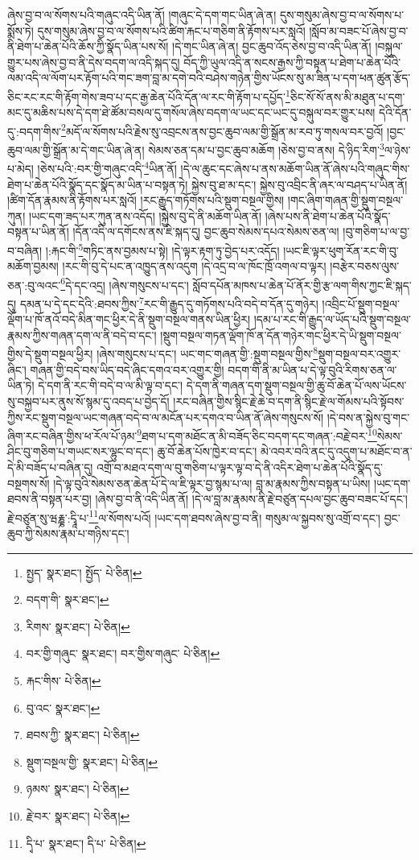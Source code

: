 ཞེས་བྱ་བ་ལ་སོགས་པའི་གཞུང་འདི་ཡིན་ནོ། །གཞུང་དེ་དག་གང་ཡིན་ཞེ་ན། དུས་གསུམ་ཞེས་བྱ་བ་ལ་སོགས་པ་སྨོས་ཏེ། དུས་གསུམ་ཞེས་བྱ་བ་ལ་སོགས་པའི་ཚིག་རྐང་པ་གཅིག་ནི་རྟོགས་པར་སླའོ། །སློབ་མ་བཟང་པོ་ཞེས་བྱ་བ་ནི་ཐེག་པ་ཆེན་པོའི་ཆོས་ཀྱི་སྣོད་ཡིན་པས་སོ། །དེ་གང་ཡིན་ཞེ་ན། བྱང་ཆུབ་འོད་ཅེས་བྱ་བ་འདི་ཡིན་ནོ། །བསྐུལ་གྱུར་པས་ཞེས་བྱ་བ་ནི་དེས་བདག་ལ་འདི་སྐད་དུ། བོད་ཀྱི་ཡུལ་འདི་ན་སངས་རྒྱས་ཀྱི་བསྟན་པ་ཐེག་པ་ཆེན་པོའི་ལམ་འདི་ལ་ལོག་པར་རྟོག་པའི་གང་ཟག་བླ་མ་དགེ་བའི་བཤེས་གཉེན་གྱིས་ཡོངས་སུ་མ་ཟིན་པ་དག་ཕན་ཚུན་རྩོད་ཅིང་རང་རང་གི་རྟོག་གེས་ཟབ་པ་དང་རྒྱ་ཆེན་པོའི་དོན་ལ་རང་གི་རྟོག་པ་དཔྱོད་\footnote{སྤྱད་  སྣར་ཐང་། སྤྱོད་  པེ་ཅིན། }ཅིང་སོ་སོ་ནས་མི་མཐུན་པ་དག་མང་དུ་མཆིས་པས་དེ་དག་ཐེ་ཚོམ་བསལ་དུ་གསོལ་ཞེས་བདག་ལ་ཡང་དང་ཡང་དུ་བསྐུལ་བར་གྱུར་པས། དེའི་དོན་དུ་:བདག་གིས་\footnote{བདག་གི་  སྣར་ཐང་། }མདོ་ལ་སོགས་པའི་རྗེས་སུ་འབྲངས་ནས་བྱང་ཆུབ་ལམ་གྱི་སྒྲོན་མ་རབ་ཏུ་གསལ་བར་བྱའོ། །བྱང་ཆུབ་ལམ་གྱི་སྒྲོན་མ་དེ་གང་ཡིན་ཞེ་ན། སེམས་ཅན་དམ་པ་བྱང་ཆུབ་མཆོག །ཅེས་བྱ་བ་ནས། དེ་ཉིད་རིག་\footnote{རིགས་  སྣར་ཐང་།  པེ་ཅིན། }ལ་ཉེས་པ་མེད། །ཅེས་པའི་:བར་གྱི་གཞུང་འདི་\footnote{བར་གྱི་གཞུང་  སྣར་ཐང་། བར་གྱིས་གཞུང་  པེ་ཅིན། }ཡིན་ནོ། །དེ་ལ་ཆུང་དང་ཞེས་པ་ནས་མཆོག་ཡིན་ནོ་ཞེས་པའི་གཞུང་གིས་ཐེག་པ་ཆེན་པོའི་སྣོད་དང་སྣོད་མ་ཡིན་པ་བསྟན་ཏེ། སྐྱེས་བུ་ཐ་མ་དང་། སྐྱེས་བུ་འབྲིང་ནི་ཞར་ལ་བཤད་པ་ཡིན་ནོ། །ཚིག་དོན་རྣམས་ནི་རྟོགས་པར་སླའོ། །རང་རྒྱུད་གཏོགས་པའི་སྡུག་བསྔལ་གྱིས། །གང་ཞིག་གཞན་གྱི་སྡུག་བསྔལ་ཀུན། །ཡང་དག་ཟད་པར་ཀུན་ནས་འདོད། །སྐྱེས་བུ་དེ་ནི་མཆོག་ཡིན་ནོ། །ཞེས་པས་ནི་ཐེག་པ་ཆེན་པོའི་སྣོད་བསྟན་པ་ཡིན་ནོ། །དོན་འདི་ལ་དགོངས་ནས་ཇི་སྐད་དུ། བྱང་ཆུབ་སེམས་དཔའ་སེམས་ཅན་ལ། །བུ་གཅིག་པ་ལ་བྱ་བ་བཞིན། །:རྐང་གི་\footnote{རྐང་གིས་  པེ་ཅིན། }གཏིང་ནས་བྱམས་པ་སྟེ། །དེ་ལྟར་རྟག་ཏུ་བྱེད་པར་འདོད། །ཡང་ཇི་ལྟར་ཕུག་རོན་རང་གི་བུ་མཆོག་བྱམས། །རང་གི་བུ་དེ་པང་ན་འཁྱུད་ནས་འདུག །དེ་འདྲ་བ་ལ་ཁོང་ཁྲོ་འགལ་བ་ལྟར། །བརྩེར་བཅས་ལུས་ཅན་:བུ་ལའང་\footnote{བུ་འང་  སྣར་ཐང་། }དེ་དང་འདྲ། །ཞེས་གསུངས་པ་དང་། སློབ་དཔོན་མཁས་པ་ཆེན་པོ་ནོར་གྱི་རྩ་ལག་གིས་ཀྱང་ཇི་སྐད་དུ། དམན་པ་དེ་དང་དེའི་:ཐབས་ཀྱིས་\footnote{ཐབས་ཀྱི་  སྣར་ཐང་།  པེ་ཅིན། }རང་གི་རྒྱུད་དུ་གཏོགས་པའི་བདེ་བ་དོན་དུ་གཉེར། །འབྲིང་པོ་སྡུག་བསྔལ་ལྡོག་པ་ཁོ་ནའོ་བདེ་མིན་གང་ཕྱིར་དེ་ནི་སྡུག་བསྔལ་གནས་ཡིན་ཕྱིར། །དམ་པ་རང་གི་རྒྱུད་ལ་ཡོད་པའི་སྡུག་བསྔལ་རྣམས་ཀྱིས་གཞན་དག་ལ་ནི་བདེ་བ་དང་། །སྡུག་བསྔལ་གཏན་ལྡོག་ཁོ་ན་དོན་གཉེར་གང་ཕྱིར་དེ་ཡི་སྡུག་བསྔལ་གྱིས་དེ་སྡུག་བསྔལ་ཕྱིར། །ཞེས་གསུངས་པ་དང་། ཡང་གང་གཞན་གྱི་:སྡུག་བསྔལ་གྱིས་\footnote{སྡུག་བསྔལ་གྱི་  སྣར་ཐང་།  པེ་ཅིན། }སྡུག་བསྔལ་བར་འགྱུར་ཞིང་། གཞན་གྱི་བདེ་བས་ཡིད་བདེ་ཞིང་དགའ་བར་འགྱུར་གྱི། བདག་གི་ནི་མ་ཡིན་པ་དེ་ལྟ་བུའི་རིགས་ཅན་ལ་ཡིན་ཏེ། དེ་དག་ནི་རང་གི་བདེ་བ་ལ་མི་ལྟ་བ་དང་། དེ་དག་ནི་གཞན་དག་སྡུག་བསྔལ་གྱི་ཆུ་བོ་ཆེན་པོ་ལས་ཡོངས་སུ་བསྐྱབ་པར་ནུས་སོ་སྙམ་དུ་འབད་པ་བྱེད་དོ། །རང་བཞིན་གྱིས་སྙིང་རྗེ་ཆེ་བ་དག་ནི་སྙིང་རྗེ་ལ་གོམས་པའི་སྟོབས་ཀྱིས་རང་སྡུག་བསྔལ་ཡང་གཞན་བདེ་བ་ལ་མངོན་པར་དགའ་བ་ཡིན་ནོ་ཞེས་གསུངས་སོ། །དེ་བས་ན་སྐྱེས་བུ་གང་ཞིག་རང་བཞིན་གྱིས་ཕ་རོལ་པོ་ཉམ་\footnote{ཉམས་  སྣར་ཐང་།  པེ་ཅིན། }ཐག་པ་དག་མཐོང་ན་མི་བཟོད་ཅིང་བདག་དང་གཞན་:བརྗེ་བར་\footnote{རྗེ་བར་  སྣར་ཐང་།  པེ་ཅིན། }སེམས་ཤིང་བུ་གཅིག་པ་གཡང་སར་ལྷུང་བ་དང་། ཆུ་བོ་ཆེན་པོས་ཁྱེར་བ་དང་། མེ་འབར་བའི་ནང་དུ་འདུག་པ་མཐོང་བ་ན་དེ་མི་བཟོད་པ་བཞིན་དུ། འགྲོ་བ་མཐའ་དག་ལ་བུ་གཅིག་པ་ལྟར་ལྟ་བ་དེ་ནི་འདིར་ཐེག་པ་ཆེན་པོའི་སྣོད་དུ་བསྔགས་སོ། །དེ་ལྟ་བུའི་སེམས་ཅན་ཆེན་པོ་དེ་ལ་ཇི་ལྟར་བྱ་སྙམ་པ་ལ། བླ་མ་རྣམས་ཀྱིས་བསྟན་པ་ཡིས། །ཡང་དག་ཐབས་ནི་བསྟན་པར་བྱ། །ཞེས་བྱ་བ་ནི་འདི་ཡིན་ནོ། །དེ་ལ་བླ་མ་རྣམས་ནི་རྗེ་བཙུན་དཔལ་བྱང་ཆུབ་བཟང་པོ་དང་། རྗེ་བཙུན་སུ་ཝརྞྞ་:དྭཱི་པ་\footnote{དྭི་པ་  སྣར་ཐང་། དི་པ་  པེ་ཅིན། }ལ་སོགས་པའོ། །ཡང་དག་ཐབས་ཞེས་བྱ་བ་ནི། གསུམ་ལ་སྐྱབས་སུ་འགྲོ་བ་དང་། བྱང་ཆུབ་ཀྱི་སེམས་རྣམ་པ་གཉིས་དང་། 